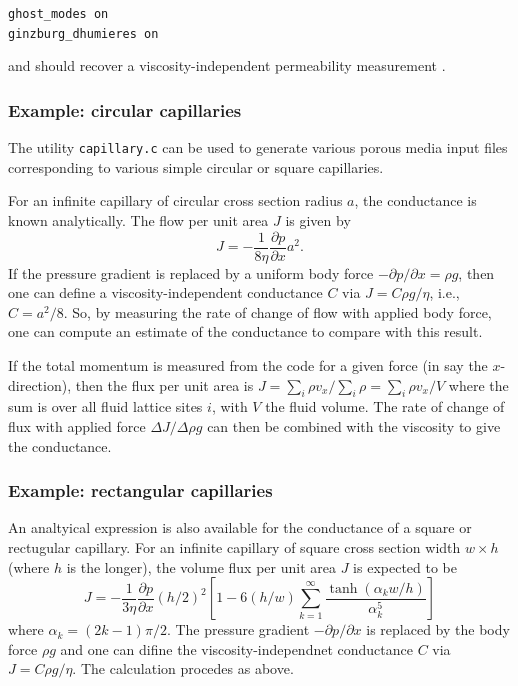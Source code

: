 \texttt{ghost\_modes on\\
ginzburg\_dhumieres on}

and should recover a viscosity-independent permeability measurement
\cite{lipanmiller,chunladd}.


\subsubsection{Example: circular capillaries}

The utility \texttt{capillary.c} can be used to generate various
porous media input files corresponding to various simple circular
or square capillaries.

For an infinite  capillary of circular cross section radius $a$,
the conductance is known analytically\cite{papanastasiou}. The
flow per unit area $J$ is given by
\begin{equation}
J = - \frac{1}{8\eta} \frac{\partial p}{ \partial x} a^2. 
\end{equation}
If the pressure gradient is replaced by a uniform body force
$-\partial p/ \partial x = \rho g$, then one can define a
viscosity-independent conductance $C$ via $ J = C \rho g / \eta$,
i.e., $C = a^2/8$. So, by measuring the rate of change of flow
with applied body force, one can compute an estimate of the conductance
to compare with this result.

If the total momentum is measured from the code for a given force
(in say the $x$-direction), then the flux per unit area is
$J = \sum_i \rho v_x / \sum_i \rho = \sum_i \rho v_x / V$
where the sum is over all fluid lattice sites $i$, with $V$
the fluid volume. The rate of change of flux with applied force
$\Delta J / \Delta\rho g$ can then be combined with the viscosity
to give the conductance.



\subsubsection{Example: rectangular capillaries}

An analtyical expression is also available for the conductance
of a square or rectugular capillary. For an infinite capillary
of square cross section width $w \times h$ (where $h$ is the
longer),
the volume flux per unit area $J$ is expected to be
\cite{papanastasiou,edo1}
\begin{equation}
J = - \frac{1}{3\eta} \frac{\partial p}{\partial x} (h/2)^2
\left[
1 - 6(h/w) \sum_{k=1}^{\infty} \frac{\tanh(\alpha_k w/h)}{\alpha_k^5} 
\right]
\end{equation}
where $\alpha_k = (2k - 1)\pi/2$. The pressure gradient
$-\partial p / \partial x$ is replaced by the body force $\rho g$ and
one can difine the viscosity-independnet conductance $C$ via
$J = C\rho g / \eta$. The calculation procedes as above.


